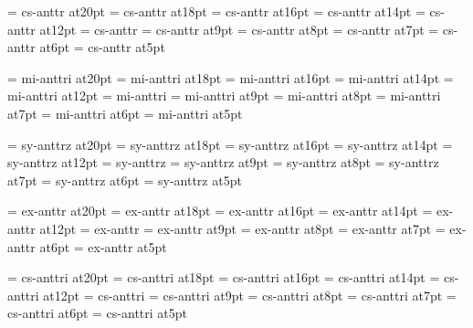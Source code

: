 

\font\twentyrm=     cs-anttr at20pt
\font\eighteenrm=   cs-anttr at18pt
\font\sixteenrm=    cs-anttr at16pt
\font\fourteenrm=   cs-anttr at14pt
\font\twelverm=     cs-anttr at12pt
\font\tenrm=        cs-anttr
\font\ninerm=       cs-anttr at9pt
\font\eightrm=      cs-anttr at8pt
\font\sevenrm=      cs-anttr at7pt
\font\sixrm=        cs-anttr at6pt
\font\fiverm=       cs-anttr at5pt

\font\twentyi=      mi-anttri at20pt
\font\eighteeni=    mi-anttri at18pt
\font\sixteeni=     mi-anttri at16pt
\font\fourteeni=    mi-anttri at14pt
\font\twelvei=      mi-anttri at12pt
\font\teni=         mi-anttri
\font\ninei=        mi-anttri at9pt
\font\eighti=       mi-anttri at8pt
\font\seveni=       mi-anttri at7pt
\font\sixi=         mi-anttri at6pt
\font\fivei=        mi-anttri at5pt

\font\twentysy=     sy-anttrz at20pt
\font\eighteensy=   sy-anttrz at18pt
\font\sixteensy=    sy-anttrz at16pt
\font\fourteensy=   sy-anttrz at14pt
\font\twelvesy=     sy-anttrz at12pt
\font\tensy=        sy-anttrz
\font\ninesy=       sy-anttrz at9pt
\font\eightsy=      sy-anttrz at8pt
\font\sevensy=      sy-anttrz at7pt
\font\sixsy=        sy-anttrz at6pt
\font\fivesy=       sy-anttrz at5pt

\font\twentyex=     ex-anttr at20pt
\font\eighteenex=   ex-anttr at18pt
\font\sixteenex=    ex-anttr at16pt
\font\fourteenex=   ex-anttr at14pt
\font\twelveex=     ex-anttr at12pt
\font\tenex=        ex-anttr
\font\nineex=       ex-anttr at9pt
\font\eightex=      ex-anttr at8pt
\font\sevenex=      ex-anttr at7pt
\font\sixex=        ex-anttr at6pt
\font\fiveex=       ex-anttr at5pt

\font\twentyit=     cs-anttri at20pt
\font\eighteenit=   cs-anttri at18pt
\font\sixteenit=    cs-anttri at16pt
\font\fourteenit=   cs-anttri at14pt
\font\twelveit=     cs-anttri at12pt
\font\tenit=        cs-anttri
\font\nineit=       cs-anttri at9pt
\font\eightit=      cs-anttri at8pt
\font\sevenit=      cs-anttri at7pt
\font\sixit=        cs-anttri at6pt
\font\fiveit=       cs-anttri at5pt

